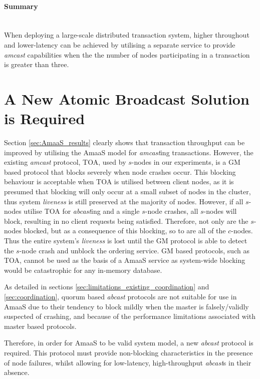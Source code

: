 \paragraph{Summary} \hspace{0pt} \\
When deploying a large-scale distributed transaction system, higher throughout and lower-latency can be achieved by utilising a separate service to provide \emph{amcast} capabilities when the the number of nodes participating in a transaction is greater than three.  

\section{A New Atomic Broadcast Solution is Required}
Section \ref{sec:AmaaS_results} clearly shows that transaction throughput can be improved by utilising the \textsf{AmaaS} model for \emph{amcast}ing transactions.  However, the existing \emph{amcast} protocol, TOA,  used by $s$-nodes in our experiments, is a GM based protocol that blocks severely when node crashes occur.  This blocking behaviour is acceptable when TOA is utilised between client nodes, as it is presumed that blocking will only occur at a small subset of nodes in the cluster, thus system \emph{liveness} is still preserved at the majority of nodes.  However, if all $s$-nodes utilise TOA for \emph{abcast}ing and a single $s$-node crashes, all $s$-nodes will block, resulting in no client requests being satisfied. Therefore, not only are the $s$-nodes blocked, but as a consequence of this blocking, so to are all of the $c$-nodes.  Thus the entire system's \emph{liveness} is lost until the GM protocol is able to detect the $s$-node crash and unblock the ordering service.  GM based protocols, such as TOA, cannot be used as the basis of a \textsf{AmaaS} service as system-wide blocking would be catastrophic for any in-memory database.  

As detailed in sections \ref{sec:limitations_existing_coordination} and \ref{sec:coordination}, quorum based \emph{abcast} protocols are not suitable for use in \textsf{AmaaS} due to their tendency to block mildly when the master is falsely/validly suspected of crashing, and because of the performance limitations associated with master based protocols.  

Therefore, in order for \textsf{AmaaS} to be valid system model, a new \emph{abcast} protocol is required.  This protocol must provide non-blocking characteristics in the presence of node failures, whilst allowing for low-latency, high-throughput \emph{abcast}s in their absence.  


